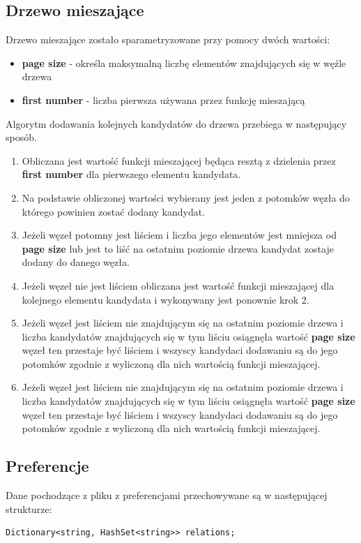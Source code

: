 \documentclass[a4paper,12pt]{article}
\begin{document}
\subsection{Drzewo mieszające}
Drzewo mieszające zostało sparametryzowane przy pomocy dwóch wartości:
\begin{itemize}
\item {\bf page size} - określa maksymalną liczbę elementów znajdujących się w węźle drzewa
\item {\bf first number} - liczba pierwsza używana przez funkcję mieszającą
\end{itemize}

Algorytm dodawania kolejnych kandydatów do drzewa przebiega w następujący sposób.
\begin{enumerate}
\item Obliczana jest wartość funkcji mieszającej będąca resztą z dzielenia przez {\bf first number} dla pierwszego elementu kandydata.
\item Na podstawie obliczonej wartości wybierany jest jeden z potomków węzła do którego powinien zostać dodany kandydat.
\item Jeżeli węzeł potomny jest liściem i liczba jego elementów jest mniejsza od {\bf page size} lub jest to liść na ostatnim poziomie drzewa kandydat zostaje dodany do danego węzła.
\item Jeżeli węzeł nie jest liściem obliczana jest wartość funkcji mieszającej dla kolejnego elementu kandydata i wykonywany jest ponownie krok 2.
\item Jeżeli węzeł jest liściem nie znajdującym się na ostatnim poziomie drzewa i liczba kandydatów znajdujących się w tym liściu osiągnęła wartość {\bf page size} węzeł ten przestaje być liściem i wszyscy kandydaci dodawaniu są do jego potomków zgodnie z wyliczoną dla nich wartością funkcji mieszającej.
\item Jeżeli węzeł jest liściem nie znajdującym się na ostatnim poziomie drzewa i liczba kandydatów znajdujących się w tym liściu osiągnęła wartość {\bf page size} węzeł ten przestaje być liściem i wszyscy kandydaci dodawaniu są do jego potomków zgodnie z wyliczoną dla nich wartością funkcji mieszającej.
\end{enumerate}

\subsection{Preferencje}

Dane pochodzące z pliku z preferencjami przechowywane są w następującej strukturze:
\begin{center}
\begin{lstlisting}
Dictionary<string, HashSet<string>> relations;
\end{lstlisting}
\end{center}
\end{document}
